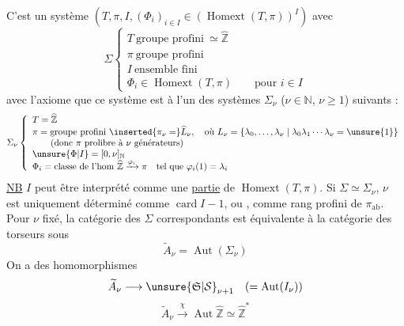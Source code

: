  C'est un système \inserted{$\Sigma=$}
$(T,\pi,I,(\Phi_i)_{i\in I}\in(\operatorname{Homext}(T,\pi))^I)$
avec
\[
\Sigma\left\{\begin{array}{l}
T\ \text{groupe profini}\ \simeq\widehat{\mathbb Z}\\
\pi\ \text{groupe profini}\\
I\ \text{ensemble fini}\\
\Phi_i\in\operatorname{Homext}(T,\pi)\qquad\text{pour }i\in I
\end{array}\right.
\]
avec l'axiome que ce système est 
à l'un des systèmes $\Sigma_\nu$ ($\nu\in\mathbb N$, $\nu\geq1$)
suivants :
\[
\Sigma_\nu\left\{\begin{array}{l}
T=\widehat{\mathbb Z}\\
\pi=\text{groupe profini }\inserted{\pi_\nu=}\widehat L_\nu,\quad
\text{où }L_\nu=\{\lambda_0,\ldots,\lambda_\nu\mid\lambda_0\lambda_1\cdots\lambda_\nu=\unsure{1}\}\\
\qquad(\text{donc }\pi\text{ prolibre à }\nu\text{ générateurs})\\
\unsure{\Phi|I}=[0,\nu]_{\mathbb N}\\
\Phi_i=\text{classe de l'hom }\widehat{\mathbb Z}\xrightarrow{\varphi_i}\pi
\quad\text{tel que }\varphi_i(1)=\lambda_i
\end{array}\right.
\]
\uline{NB} $I$ peut être interprété comme une \uline{partie} de $\operatorname{Homext}(T,\pi)$.
Si $\Sigma\simeq\Sigma_\nu$, $\nu$ est uniquement déterminé
comme $\operatorname{card}I-1$, ou 
, comme rang profini de $\pi_{\mathrm{ab}}$. Pour
$\nu$ fixé, la catégorie des $\Sigma$ correspondants
est équivalente à la catégorie des torseurs
sous
\[
\widetilde A_\nu=\operatorname{Aut}(\Sigma_\nu)
\]
On a des homomorphismes
\[
\widetilde A_\nu\longrightarrow\unsure{\mathfrak S|\mathcal S}_{\nu+1}
\quad(=\operatorname{Aut}(I_\nu))
\]
\[
\widetilde A_\nu\xrightarrow{\chi}\operatorname{Aut}\widehat{\mathbb Z}
\simeq\widehat{\mathbb Z}^{*}
\]

